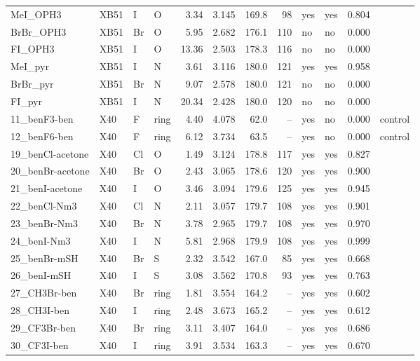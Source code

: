 {\begin{longtable}{llllrrrrllrl}
MeI\_OPH3 & XB51 & I & O & 3.34 & 3.145 & 169.8 & 98 & yes & yes & 0.804 & \\
BrBr\_OPH3 & XB51 & Br & O & 5.95 & 2.682 & 176.1 & 110 & no & no & 0.000 & \\
FI\_OPH3 & XB51 & I & O & 13.36 & 2.503 & 178.3 & 116 & no & no & 0.000 & \\
MeI\_pyr & XB51 & I & N & 3.61 & 3.116 & 180.0 & 121 & yes & yes & 0.958 & \\
BrBr\_pyr & XB51 & Br & N & 9.07 & 2.578 & 180.0 & 121 & no & no & 0.000 & \\
FI\_pyr & XB51 & I & N & 20.34 & 2.428 & 180.0 & 120 & no & no & 0.000 & \\
11\_benF3-ben & X40 & F & ring & 4.40 & 4.078 & 62.0 & -- & yes & no & 0.000 & control\\
12\_benF6-ben & X40 & F & ring & 6.12 & 3.734 & 63.5 & -- & yes & no & 0.000 & control\\
19\_benCl-acetone & X40 & Cl & O & 1.49 & 3.124 & 178.8 & 117 & yes & yes & 0.827 & \\
20\_benBr-acetone & X40 & Br & O & 2.43 & 3.065 & 178.6 & 120 & yes & yes & 0.900 & \\
21\_benI-acetone & X40 & I & O & 3.46 & 3.094 & 179.6 & 125 & yes & yes & 0.945 & \\
22\_benCl-Nm3 & X40 & Cl & N & 2.11 & 3.057 & 179.7 & 108 & yes & yes & 0.901 & \\
23\_benBr-Nm3 & X40 & Br & N & 3.78 & 2.965 & 179.7 & 108 & yes & yes & 0.970 & \\
24\_benI-Nm3 & X40 & I & N & 5.81 & 2.968 & 179.9 & 108 & yes & yes & 0.999 & \\
25\_benBr-mSH & X40 & Br & S & 2.32 & 3.542 & 167.0 & 85 & yes & yes & 0.668 & \\
26\_benI-mSH & X40 & I & S & 3.08 & 3.562 & 170.8 & 93 & yes & yes & 0.763 & \\
27\_CH3Br-ben & X40 & Br & ring & 1.81 & 3.554 & 164.2 & -- & yes & yes & 0.602 & \\
28\_CH3I-ben & X40 & I & ring & 2.48 & 3.673 & 165.2 & -- & yes & yes & 0.612 & \\
29\_CF3Br-ben & X40 & Br & ring & 3.11 & 3.407 & 164.0 & -- & yes & yes & 0.686 & \\
30\_CF3I-ben & X40 & I & ring & 3.91 & 3.534 & 163.3 & -- & yes & yes & 0.670 & \\
\end{longtable}}
